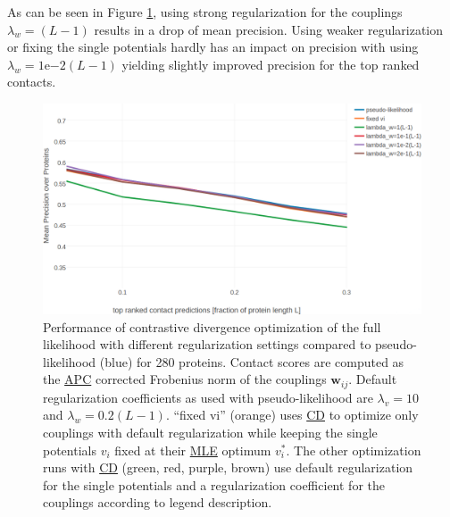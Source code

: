 \documentclass[12pt,a4paper,twoside]{book}
\newcommand{\eq}{\!=\!}
\newcommand{\vi}{v_{i}}
\newcommand{\wij}{\mathbf{w}_{ij}}
\theoremstyle{definition}
\theoremstyle{definition}
\theoremstyle{remark}
\begin{document}
As can be seen in Figure \ref{fig:precison-cd-regularization}, using
strong regularization for the couplings \(\lambda_w \eq (L-1)\) results
in a drop of mean precision. Using weaker regularization or fixing the
single potentials hardly has an impact on precision with using
\(\lambda_w \eq 1\mathrm{e}{-2}(L-1)\) yielding slightly improved
precision for the top ranked contacts.

















\begin{figure}

{\centering \includegraphics[width=0.9\linewidth]{img/full_likelihood/precision_vs_rank_notitle_cd_comparing_regularizers} 

}

\caption{Performance of contrastive
divergence optimization of the full likelihood with different
regularization settings compared to pseudo-likelihood (blue) for 280
proteins. Contact scores are computed as the
\protect\hyperlink{abbrev}{APC} corrected Frobenius norm of the
couplings \(\wij\). Default regularization coefficients as used with
pseudo-likelihood are \(\lambda_v \eq 10\) and
\(\lambda_w \eq 0.2(L-1)\). ``fixed vi'' (orange) uses
\protect\hyperlink{abbrev}{CD} to optimize only couplings with default
regularization while keeping the single potentials \(\vi\) fixed at
their \protect\hyperlink{abbrev}{MLE} optimum \(\vi^*\). The other
optimization runs with \protect\hyperlink{abbrev}{CD} (green, red,
purple, brown) use default regularization for the single potentials and
a regularization coefficient for the couplings according to legend
description.}\label{fig:precison-cd-regularization}
\end{figure}
\end{document}
